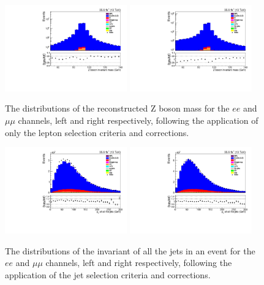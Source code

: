 \begin{figure}[h]
\centering
\includegraphics[width=0.47\textwidth]{figs/background-estimation/plots/unblinded/prompt_ee_ttbarInc/zPairMass_NPL_ee_lepSel_ee_log.pdf}
\includegraphics[width=0.47\textwidth]{figs/background-estimation/plots/unblinded/prompt_mumu_ttbarInc/zPairMass_NPL_mumu_lepSel_mumu_log.pdf}
\caption{
The distributions of the reconstructed Z boson mass for the $ee$ and $\mu\mu$ channels, left and right respectively, following the application of only the lepton selection criteria and corrections.
}
\label{fig:SR_zBoson}
\end{figure}

\begin{figure}[h]
\centering
\includegraphics[width=0.47\textwidth]{figs/background-estimation/plots/unblinded/prompt_ee_ttbarInc/totalJetPt_NPL_ee_jetSel_ee.pdf}
\includegraphics[width=0.47\textwidth]{figs/background-estimation/plots/unblinded/prompt_mumu_ttbarInc/totalJetPt_NPL_mumu_jetSel_mumu.pdf}
\caption{
The distributions of the invariant \pT of all the jets in an event for the $ee$ and $\mu\mu$ channels, left and right respectively, following the application of the jet selection criteria and corrections.
}
\label{fig:SR_totJetPt}
\end{figure}

